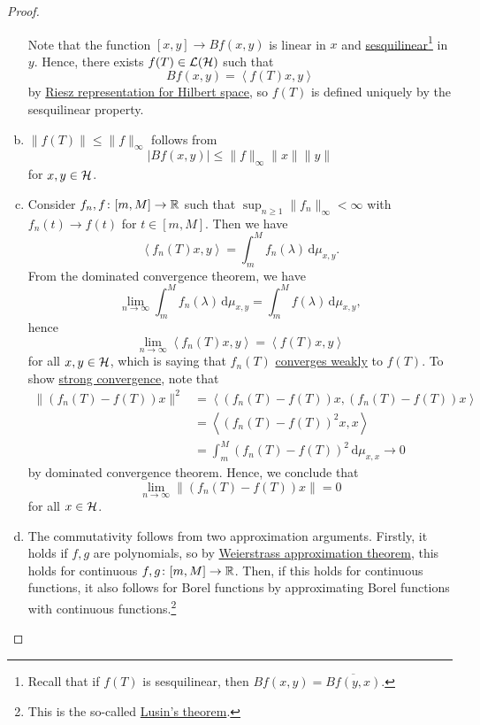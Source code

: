 \begin{proof}
\begin{enumerate}[(a)]
		      Note that the function \([x, y] \to Bf(x, y)\) is linear in \(x\) and \href{https://en.wikipedia.org/wiki/Sesquilinear_form}{sesquilinear}\footnote{Recall that if \(f(T)\) is sesquilinear, then \(Bf(x, y) = \overline{Bf(y, x)}\).} in \(y\). Hence, there exists \(f(T) \in \mathcal{\MakeUppercase{l}} (\mathcal{\MakeUppercase{h}} )\) such that
		      \[
			      Bf(x, y) = \left\langle f(T)x, y \right\rangle
		      \]
		      by \hyperref[thm:Riesz-representation]{Riesz representation for Hilbert space}, so \(f(T)\) is defined uniquely by the sesquilinear property.
		\item \(\lVert f(T) \rVert \leq \lVert f \rVert _\infty \) follows from
		      \[
			      \vert Bf(x, y) \vert  \leq \lVert f \rVert _\infty \lVert x \rVert \lVert y \rVert
		      \]
		      for \(x, y\in \mathcal{\MakeUppercase{h}} \).
		\item Consider \(f_n, f\colon [m, M] \to \mathbb{\MakeUppercase{r}} \) such that \(\sup _{n\geq 1} \lVert f_n \rVert _\infty < \infty \) with \(f_n(t) \to f(t)\) for \(t\in [m, M]\). Then we have
		      \[
			      \left\langle f_n (T)x, y \right\rangle = \int_{m}^{M} f_n(\lambda ) \,\mathrm{d}\mu _{x, y}.
		      \]
		      From the dominated convergence theorem, we have
		      \[
			      \lim_{n \to \infty} \int_{m}^{M} f_n(\lambda ) \,\mathrm{d}\mu _{x, y} = \int_{m}^{M} f(\lambda ) \,\mathrm{d}\mu _{x, y},
		      \]
		      hence
		      \[
			      \lim_{n \to \infty} \left\langle f_n(T)x, y \right\rangle = \left\langle f(T)x, y \right\rangle
		      \]
		      for all \(x, y\in \mathcal{\MakeUppercase{h}} \), which is saying that \(f_n(T)\) \hyperref[def:weakly-convergence]{converges weakly} to \(f(T)\). To show \hyperref[def:strongly-convergence]{strong convergence}, note that
		      \[
			      \begin{split}
				      \lVert (f_n(T) - f(T)) x \rVert ^2
				      &= \left\langle (f_n(T) - f(T)) x, (f_n(T) - f(T)) x \right\rangle \\
				      &= \left\langle (f_n(T) - f(T))^2 x, x \right\rangle \\
				      &= \int_{m}^{M} (f_n(T) - f(T))^2 \,\mathrm{d}\mu _{x, x}
				      \to 0
			      \end{split}
		      \]
		      by dominated convergence theorem. Hence, we conclude that
		      \[
			      \lim_{n \to \infty} \lVert (f_n(T) - f(T)) x \rVert = 0
		      \]
		      for all \(x\in \mathcal{\MakeUppercase{h}} \).
		\item The commutativity follows from two approximation arguments. Firstly, it holds if \(f, g\) are polynomials, so by \hyperref[thm:Weierstrass-approximation]{Weierstrass approximation theorem}, this holds for continuous \(f, g\colon [m, M] \to \mathbb{\MakeUppercase{r}} \). Then, if this holds for continuous functions, it also follows for Borel functions by approximating Borel functions with continuous functions.\footnote{This is the so-called \href{https://en.wikipedia.org/wiki/Lusin's_theorem}{Lusin's theorem}.}
	\end{enumerate}
\end{proof}


